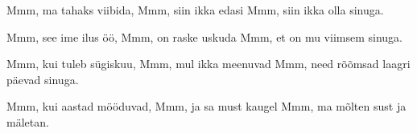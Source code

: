 Mmm, ma tahaks viibida,
Mmm, siin ikka edasi
Mmm, siin ikka olla sinuga.

Mmm, see ime ilus \"o\"o, Mmm, on raske uskuda
Mmm, et on mu viimsem sinuga.

Mmm, kui tuleb s\"ugiskuu, 
Mmm, mul ikka meenuvad
Mmm, need r\~o\~omsad laagri p\"aevad sinuga.

Mmm, kui aastad m\"o\"oduvad, 
Mmm, ja sa must kaugel
Mmm, ma m\~olten sust ja m\"aletan.